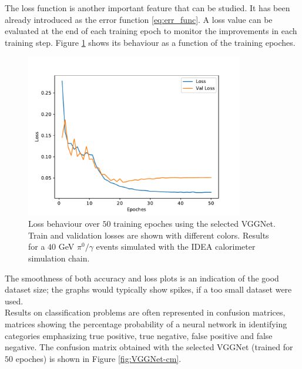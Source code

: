 The loss function is another important feature that can be studied. It has been already introduced as the error function \ref{eq:err_func}. A loss value can be evaluated at the end of each training epoch to monitor the improvements in each training step. Figure \ref{fig:VGGNet-loss} shows its behaviour as a function of the training epoches.\\

\begin{figure}
	\centering
	\includegraphics[width=0.85\textwidth]{IMG/Cap6/VGGNet-D_Loss.pdf}
	\caption{Loss behaviour over $50$ training epoches using the selected VGGNet. Train and validation losses are shown with different colors. Results for a $40$ GeV $\pi^0/\gamma$ events simulated with the IDEA calorimeter simulation chain.}
	\label{fig:VGGNet-loss}
\end{figure}

The smoothness of both accuracy and loss plots is an indication of the good dataset size; the graphs would typically show spikes, if a too small dataset were used. \\

Results on classification problems are often represented in confusion matrices, matrices showing the percentage probability of a neural network in identifying categories emphasizing true positive, true negative, false positive and false negative. The confusion matrix obtained with the selected VGGNet (trained for $50$ epoches) is shown in Figure \ref{fig:VGGNet-cm}.


